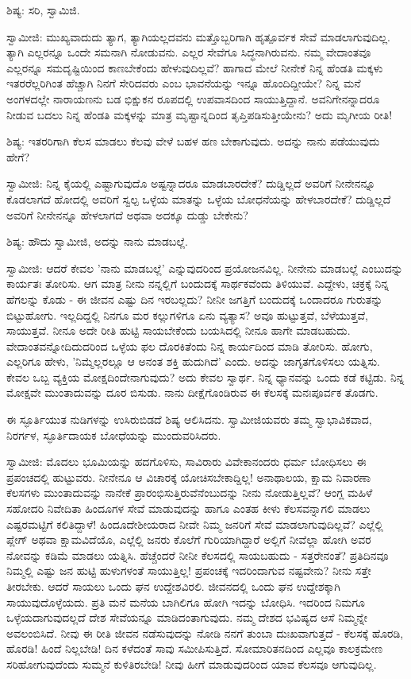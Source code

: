 ಶಿಷ್ಯ: ಸರಿ, ಸ್ವಾಮಿಜಿ.

ಸ್ವಾಮೀಜಿ: ಮುಖ್ಯವಾದುದು ತ್ಯಾಗ, ತ್ಯಾಗಿಯಲ್ಲದವನು ಮತ್ತೊಬ್ಬರಿಗಾಗಿ ಹೃತ್ಪೂರ್ವಕ ಸೇವೆ ಮಾಡಲಾಗುವುದಿಲ್ಲ. ತ್ಯಾಗಿ ಎಲ್ಲರನ್ನೂ ಒಂದೇ ಸಮನಾಗಿ ನೋಡುವನು. ಎಲ್ಲರ ಸೇವೆಗೂ ಸಿದ್ಧನಾಗಿರುವನು. ನಮ್ಮ ವೇದಾಂತವೂ ಎಲ್ಲರನ್ನೂ ಸಮದೃಷ್ಟಿಯಿಂದ ಕಾಣಬೇಕೆಂದು ಹೇಳುವುದಿಲ್ಲವೆ? ಹಾಗಾದ ಮೇಲೆ ನೀನೇಕೆ ನಿನ್ನ ಹೆಂಡತಿ ಮಕ್ಕಳು ಇತರರೆಲ್ಲರಿಗಿಂತ ಹೆಚ್ಚಾಗಿ ನಿನಗೆ ಸೇರಿದವರು ಎಂಬ ಭಾವನೆಯನ್ನು ಇನ್ನೂ ಹೊಂದಿದ್ದೀಯೇ? ನಿನ್ನ ಮನೆ ಅಂಗಳದಲ್ಲೇ ನಾರಾಯಣನು ಬಡ ಭಿಕ್ಷುಕನ ರೂಪದಲ್ಲಿ ಉಪವಾಸದಿಂದ ಸಾಯುತ್ತಿದ್ದಾನೆ. ಅವನಿಗೇನನ್ನಾದರೂ ನೀಡುವ ಬದಲು ನಿನ್ನ ಹೆಂಡತಿ ಮಕ್ಕಳನ್ನು ಮಾತ್ರ ಮೃಷ್ಟಾನ್ನದಿಂದ ತೃಪ್ತಿಪಡಿಸುತ್ತೀಯೇನು? ಅದು ಮೃಗೀಯ ರೀತಿ!

ಶಿಷ್ಯ: ಇತರರಿಗಾಗಿ ಕೆಲಸ ಮಾಡಲು ಕೆಲವು ವೇಳೆ ಬಹಳ ಹಣ ಬೇಕಾಗುವುದು. ಅದನ್ನು ನಾನು ಪಡೆಯುವುದು ಹೇಗೆ?

ಸ್ವಾಮೀಜಿ: ನಿನ್ನ ಕೈಯಲ್ಲಿ ಎಷ್ಟಾಗುವುದೊ ಅಷ್ಟನ್ನಾದರೂ ಮಾಡಬಾರದೇಕೆ? ದುಡ್ಡಿಲ್ಲದೆ ಅವರಿಗೆ ನೀನೇನನ್ನೂ ಕೊಡಲಾಗದೆ ಹೋದಲ್ಲಿ ಅವರಿಗೆ ಸ್ವಲ್ಪ ಒಳ್ಳೆಯ ಮಾತನ್ನು ಒಳ್ಳೆಯ ಬೋಧನೆಯನ್ನು ಹೇಳಬಾರದೇಕೆ? ದುಡ್ಡಿಲ್ಲದೆ ಅವರಿಗೆ ನೀನೇನನ್ನೂ ಹೇಳಲಾಗದೆ ಅಥವಾ ಅದಕ್ಕೂ ದುಡ್ಡು ಬೇಕೇನು?

ಶಿಷ್ಯ: ಹೌದು ಸ್ವಾಮೀಜಿ, ಅದನ್ನು ನಾನು ಮಾಡಬಲ್ಲೆ.

ಸ್ವಾಮೀಜಿ: ಆದರೆ ಕೇವಲ 'ನಾನು ಮಾಡಬಲ್ಲೆ' ಎನ್ನುವುದರಿಂದ ಪ್ರಯೋಜನವಿಲ್ಲ. ನೀನೇನು ಮಾಡಬಲ್ಲೆ ಎಂಬುದನ್ನು ಕಾರ್ಯತಃ ತೋರಿಸು. ಆಗ ಮಾತ್ರ ನೀನು ನನ್ನಲ್ಲಿಗೆ ಬಂದುದಕ್ಕೆ ಸಾರ್ಥಕವೆಂದು ತಿಳಿಯುವೆ. ಎದ್ದೇಳು, ಚಕ್ರಕ್ಕೆ ನಿನ್ನ ಹೆಗಲನ್ನು ಕೊಡು - ಈ ಜೀವನ ಎಷ್ಟು ದಿನ ಇರಬಲ್ಲದು? ನೀನೀ ಜಗತ್ತಿಗೆ ಬಂದುದಕ್ಕೆ ಒಂದಾದರೂ ಗುರುತನ್ನು ಬಿಟ್ಟುಹೋಗು. ಇಲ್ಲದಿದ್ದಲ್ಲಿ ನಿನಗೂ ಮರ ಕಲ್ಲುಗಳಿಗೂ ಏನು ವ್ಯತ್ಯಾಸ? ಅವೂ ಹುಟ್ಟುತ್ತವೆ, ಬೆಳೆಯುತ್ತವೆ, ಸಾಯುತ್ತವೆ. ನೀನೂ ಅದೇ ರೀತಿ ಹುಟ್ಟಿ ಸಾಯಬೇಕೆಂದು ಬಯಸಿದಲ್ಲಿ ನೀನೂ ಹಾಗೇ ಮಾಡಬಹುದು. ವೇದಾಂತವನ್ನೋದಿದುದರಿಂದ ಒಳ್ಳೆಯ ಫಲ ದೊರಕಿತೆಂದು ನಿನ್ನ ಕಾರ್ಯದಿಂದ ಮಾಡಿ ತೋರಿಸು. ಹೋಗು, ಎಲ್ಲರಿಗೂ ಹೇಳು, 'ನಿಮ್ಮೆಲ್ಲರಲ್ಲೂ ಆ ಅನಂತ ಶಕ್ತಿ ಹುದುಗಿದೆ' ಎಂದು. ಅದನ್ನು ಜಾಗೃತಗೊಳಿಸಲು ಯತ್ನಿಸು. ಕೇವಲ ಒಬ್ಬ ವ್ಯಕ್ತಿಯ ಮೋಕ್ಷದಿಂದೇನಾಗುವುದು? ಅದು ಕೇವಲ ಸ್ವಾರ್ಥ. ನಿನ್ನ ಧ್ಯಾನವನ್ನು ಒಂದು ಕಡೆ ಕಟ್ಟಿಡು. ನಿನ್ನ ಮೋಕ್ಷವೇ ಮುಂತಾದುವನ್ನು ದೂರ ಬಿಸುಡು. ನಾನು ದೀಕ್ಷೆಗೊಂಡಿರುವ ಈ ಕೆಲಸಕ್ಕೆ ಮನಃಪೂರ್ವಕ ತೊಡಗು.

ಈ ಸ್ಫೂರ್ತಿಯುತ ನುಡಿಗಳನ್ನು ಉಸಿರುಬಿಡದೆ ಶಿಷ್ಯ ಆಲಿಸಿದನು. ಸ್ವಾಮೀಜಿಯವರು ತಮ್ಮ ಸ್ವಾಭಾವಿಕವಾದ, ನಿರರ್ಗಳ, ಸ್ಫೂರ್ತಿದಾಯಕ ಬೋಧೆಯನ್ನು ಮುಂದುವರಿಸಿದರು.

ಸ್ವಾಮೀಜಿ: ಮೊದಲು ಭೂಮಿಯನ್ನು ಹದಗೊಳಿಸು, ಸಾವಿರಾರು ವಿವೇಕಾನಂದರು ಧರ್ಮ ಬೋಧಿಸಲು ಈ ಪ್ರಪಂಚದಲ್ಲಿ ಹುಟ್ಟುವರು. ನೀನೇನೂ ಆ ವಿಚಾರಕ್ಕೆ ಯೋಚಿಸಬೇಕಾದ್ದಿಲ್ಲ! ಅನಾಥಾಲಯ, ಕ್ಷಾಮ ನಿವಾರಣಾ ಕೆಲಸಗಳು ಮುಂತಾದುವನ್ನು ನಾನೇಕೆ ಪ್ರಾರಂಭಿಸುತ್ತಿರುವೆನೆಂಬುದನ್ನು ನೀನು ನೋಡುತ್ತಿಲ್ಲವೆ? ಆಂಗ್ಲ ಮಹಿಳೆ ಸಹೋದರಿ ನಿವೇದಿತಾ ಹಿಂದೂಗಳ ಸೇವೆ ಮಾಡುವುದನ್ನು ಹಾಗೂ ಎಂತಹ ಕೀಳು ಕೆಲಸವನ್ನಾಗಲಿ ಮಾಡಲು ಎಷ್ಟರಮಟ್ಟಿಗೆ ಕಲಿತಿದ್ದಾಳೆ! ಹಿಂದೂದೇಶೀಯರಾದ ನೀವೇ ನಿಮ್ಮ ಜನರಿಗೆ ಸೇವೆ ಮಾಡಲಾಗುವುದಿಲ್ಲವೆ? ಎಲ್ಲೆಲ್ಲಿ ಪ್ಲೇಗ್ ಅಥವಾ ಕ್ಷಾಮವಿದೆಯೊ, ಎಲ್ಲೆಲ್ಲಿ ಜನರು ಕೊಲೆಗೆ ಗುರಿಯಾಗಿದ್ದಾರೆ ಅಲ್ಲಿಗೆ ನೀವೆಲ್ಲಾ ಹೋಗಿ ಅವರ ನೋವನ್ನು ಕಡಿಮೆ ಮಾಡಲು ಯತ್ನಿಸಿ. ಹೆಚ್ಚೆಂದರೆ ನೀನೀ ಕೆಲಸದಲ್ಲಿ ಸಾಯಬಹುದು - ಸತ್ತರೇನಂತೆ? ಪ್ರತಿದಿನವೂ ನಿಮ್ಮಲ್ಲಿ ಎಷ್ಟು ಜನ ಹುಟ್ಟಿ ಹುಳುಗಳಂತೆ ಸಾಯುತ್ತಿಲ್ಲ! ಪ್ರಪಂಚಕ್ಕೆ ಇದರಿಂದಾಗುವ ನಷ್ಟವೇನು? ನೀನು ಸತ್ತೇ ತೀರಬೇಕು. ಆದರೆ ಸಾಯಲು ಒಂದು ಘನ ಉದ್ದೇಶವಿರಲಿ. ಜೀವನದಲ್ಲಿ ಒಂದು ಘನ ಉದ್ದೇಶಕ್ಕಾಗಿ ಸಾಯುವುದೊಳ್ಳೆಯದು. ಪ್ರತಿ ಮನೆ ಮನೆಯ ಬಾಗಿಲಿಗೂ ಹೋಗಿ ಇದನ್ನು ಬೋಧಿಸಿ. ಇದರಿಂದ ನಿಮಗೂ ಒಳ್ಳೆಯದಾಗುವುದಲ್ಲದೆ ದೇಶ ಸೇವೆಯನ್ನೂ ಮಾಡಿದಂತಾಗುವುದು. ನಮ್ಮ ದೇಶದ ಭವಿಷ್ಯದ ಆಸೆ ನಿಮ್ಮನ್ನೇ ಅವಲಂಬಿಸಿದೆ. ನೀವು ಈ ರೀತಿ ಜೀವನ ನಡೆಸುವುದನ್ನು ನೋಡಿ ನನಗೆ ತುಂಬಾ ದುಃಖವಾಗುತ್ತದೆ - ಕೆಲಸಕ್ಕೆ ಹೊರಡಿ, ಹೊರಡಿ! ಹಿಂದೆ ನಿಲ್ಲಬೇಡಿ! ದಿನ ಕಳೆದಂತೆ ಸಾವು ಸಮೀಪಿಸುತ್ತಿದೆ. ಸೋಮಾರಿತನದಿಂದ ಎಲ್ಲವೂ ಕಾಲಕ್ರಮೇಣ ಸರಿಹೋಗುವುದೆಂದು ಸುಮ್ಮನೆ ಕುಳಿತಿರಬೇಡಿ! ನೀವು ಹೀಗೆ ಮಾಡುವುದರಿಂದ ಯಾವ ಕೆಲಸವೂ ಆಗುವುದಿಲ್ಲ.

